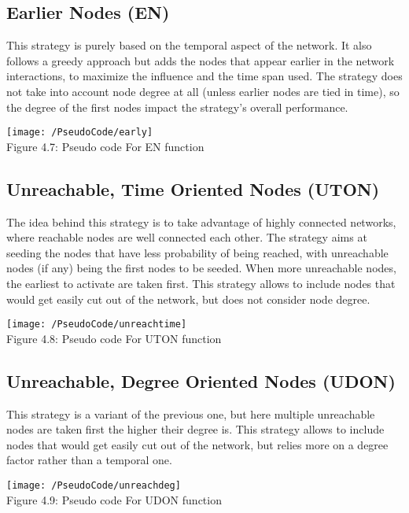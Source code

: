 \subsection{Earlier Nodes (EN)}
\label{sec:strattimeorder}
This strategy is purely based on the temporal aspect of the network. It also follows a greedy approach but adds the nodes that appear earlier in the network interactions, to maximize the influence and the time span used. The strategy does not take into account node degree at all (unless earlier nodes are tied in time), so the degree of the first nodes impact the strategy's overall performance.

\begin{center}
    \texttt{[image: /PseudoCode/early]}
    \\
    Figure 4.7: Pseudo code For EN function
\end{center}

\subsection{Unreachable, Time Oriented Nodes (UTON)}
\label{sec:strattimeiso}
The idea behind this strategy is to take advantage of highly connected networks, where reachable nodes are well connected each other. The strategy aims at seeding the nodes that have less probability of being reached, with unreachable nodes (if any) being the first nodes to be seeded. When more unreachable nodes, the earliest to activate are taken first. This strategy allows to include nodes that would get easily cut out of the network, but does not consider node degree.

\begin{center}
    \texttt{[image: /PseudoCode/unreachtime]}
    \\
    Figure 4.8: Pseudo code For UTON function
\end{center}

\subsection{Unreachable, Degree Oriented Nodes (UDON)}
\label{sec:stratdegreeiso}
This strategy is a variant of the previous one, but here multiple unreachable nodes are taken first the higher their degree is.  This strategy allows to include nodes that would get easily cut out of the network, but relies more on a degree factor rather than a temporal one.

\begin{center}
    \texttt{[image: /PseudoCode/unreachdeg]}
    \\
    Figure 4.9: Pseudo code For UDON function
\end{center}


